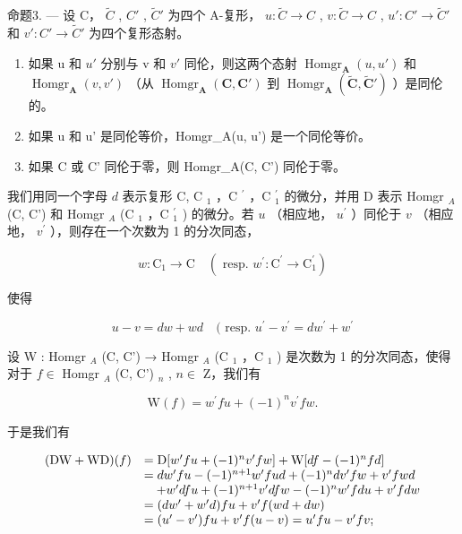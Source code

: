 命题3. --- 设 C， \(\tilde{C}\) , \(C'\) , \(\tilde{C}'\) 为四个 A-复形， \(u: \tilde{C} \to C\) , \(v: \tilde{C} \to C\) , \(u': C' \to \tilde{C}'\) 和 \(v': C' \to \tilde{C}'\) 为四个复形态射。

\begin{enumerate}
\def\labelenumi{\alph{enumi})}
\item
  如果 u 和 \(u'\) 分别与 v 和 \(v'\) 同伦，则这两个态射 \(\operatorname{Homgr}_{\mathbf{A}}(u, u')\) 和 \(\operatorname{Homgr}_{\mathbf{A}}(v, v')\) （从 \(\operatorname{Homgr}_{\mathbf{A}}(\mathbf{C}, \mathbf{C}')\) 到 \(\operatorname{Homgr}_{\mathbf{A}}(\tilde{\mathbf{C}}, \tilde{\mathbf{C}}')\) ）是同伦的。
\item
  如果 u 和 u' 是同伦等价，Homgr\_A(u, u') 是一个同伦等价。
\item
  如果 C 或 C' 同伦于零，则 Homgr\_A(C, C') 同伦于零。
\end{enumerate}

我们用同一个字母 \(d\) 表示复形 C, C \(_{1}\) ，C \(^{\prime}\) ，C \(_{1}^{\prime}\) 的微分，并用 D 表示 Homgr \(_{A}\) (C, C') 和 Homgr \(_{A}\) (C \(_{1}\) ，C \(_{1}^{\prime}\) ) 的微分。若 \(u\) （相应地， \(u^{\prime}\) ）同伦于 \(v\) （相应地， \(v^{\prime}\) ），则存在一个次数为 1 的分次同态，

\[
w: \mathrm{C} _ {1} \rightarrow \mathrm{C} \quad (\text { resp. } w ^ {\prime}: \mathrm{C} ^ {\prime} \rightarrow \mathrm{C} _ {1} ^ {\prime})
\]

使得

\[
u - v = d w + w d \quad (\text { resp. } u ^ {\prime} - v ^ {\prime} = d w ^ {\prime} + w ^ {\prime}\tag{2}
\]

设 W : Homgr \(_{A}\) (C, C') → Homgr \(_{A}\) (C \(_{1}\) ，C \(_{1}\) ) 是次数为 1 的分次同态，使得对于 \(f \in\) Homgr \(_{A}\) (C, C') \(_{n}\) , \(n \in\) Z，我们有

\[
\mathrm{W} (f) = w ^ {\prime} f u + (- 1) ^ {n} v ^ {\prime} f w.\tag{3}
\]

于是我们有

\[
\begin{array}{r l} (\mathrm{DW} + \mathrm{WD}) (f) & = \mathrm{D} [ w ^ {\prime} f u + (- 1) ^ {n} v ^ {\prime} f w ] + \mathrm{W} [ d f - (- 1) ^ {n} f d ] \\ & = d w ^ {\prime} f u - (- 1) ^ {n + 1} w ^ {\prime} f u d + (- 1) ^ {n} d v ^ {\prime} f w + v ^ {\prime} f w d \\ & \quad + w ^ {\prime} d f u + (- 1) ^ {n + 1} v ^ {\prime} d f w - (- 1) ^ {n} w ^ {\prime} f d u + v ^ {\prime} f d w \\ & = (d w ^ {\prime} + w ^ {\prime} d) f u + v ^ {\prime} f (w d + d w) \\ & = (u ^ {\prime} - v ^ {\prime}) f u + v ^ {\prime} f (u - v) = u ^ {\prime} f u - v ^ {\prime} f v; \end{array}
\]

